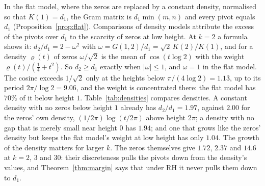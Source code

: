 \documentclass[11pt]{article}
\theoremstyle{definition}
\newcommand{\KH}{K}
\begin{document}
In the flat model, where the zeros are replaced by a constant density, normalised so that $\KH(1) = d_1$, the Gram
matrix is $d_1 \min(m, n)$ and every pivot equals $d_1$ (Proposition~\ref{prop:flat}). Comparisons of density models
attribute the excess of the pivots over $d_1$ to the scarcity of zeros at low height. At $k = 2$ a formula shows it:
$d_2/d_1 = 2 - \omega^2$ with $\omega = G(1, 2)/d_1 = \sqrt2\,\KH(2)/\KH(1)$, and for a density $\varrho(t)$ of
zeros $\omega/\sqrt2$ is the mean of $\cos(t \log 2)$ with the weight $\varrho(t)/(\frac14 + t^2)$. So $d_2 \ge d_1$
exactly when $|\omega| \le 1$, and $\omega = 1$ in the flat model. The cosine exceeds $1/\sqrt2$ only at the heights
below $\pi/(4 \log 2) = 1.13$, up to its period $2\pi/\log 2 = 9.06$, and the weight is concentrated there: the flat
model has $70\%$ of it below height $1$. Table~\ref{tab:densities} compares densities. A constant density with no
zeros below
height $1$ already has $d_2/d_1 = 1.97$, against $2.00$ for the zeros' own density, $(1/2\pi)\log(t/2\pi)$ above
height $2\pi$; a density with no gap that is merely small near height $0$ has $1.94$; and one that grows like the
zeros' density but keeps the flat model's weight at low height has only $1.04$. The growth of the density matters for
larger $k$. The zeros themselves give $1.72$, $2.37$ and $14.6$ at $k = 2$, $3$ and $30$: their discreteness pulls
the pivots down from the density's values, and Theorem~\ref{thm:margin}
says that under RH it never pulls them down to $d_1$.
\end{document}
